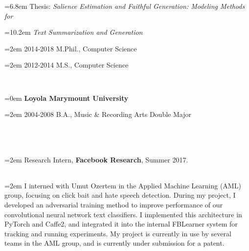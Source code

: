 \documentclass{scrartcl}
\newcommand{\MarginSection}[1]{\marginpar{#1}}
\newcommand{\NewEntry}[2]{\noindent\hangindent=0em\hangafter=0 \parbox{4em}{\small #1} #2 
\vspace{0.35em}} %
\begin{document}
\begin{cv}{}
{\noindent\hangindent=6.8em Thesis: \textit{Salience Estimation and Faithful Generation: Modeling Methods for}

\noindent\hangindent=10.2em \textit{Text Summarization and Generation}


\noindent\hangindent=2em 2014-2018 M.Phil., Computer Science 

\noindent\hangindent=2em 2012-2014 M.S., Computer Science 

}

{~\vspace{-1.25em}\\}

{\noindent\hangindent=0em \textbf{Loyola Marymount University} }

{\noindent\hangindent=2em 2004-2008 B.A., Music \& Recording Arts Double Major

}





    
~\\~\\~\\


\MarginSection{~\\Research\\Experience}\noindent\hangindent=2em Research Intern, \textbf{Facebook Research}, Summer 2017.\\

{~\vspace{-3.5em}\\}

\noindent\hangindent=2em I interned with Umut Ozertem in the 
Applied Machine Learning (AML) group, focusing on click bait and hate speech 
detection.
During my project, I developed an adversarial training method to improve 
performance of our convolutional neural network text classifiers.
I implemented this architecture in PyTorch and Caffe2, and integrated it into
the internal FBLearner system for tracking and running experiments.
My project is currently in use by several teams in the AML group, and is currently under submission for a patent.


\end{cv}
\end{document}
